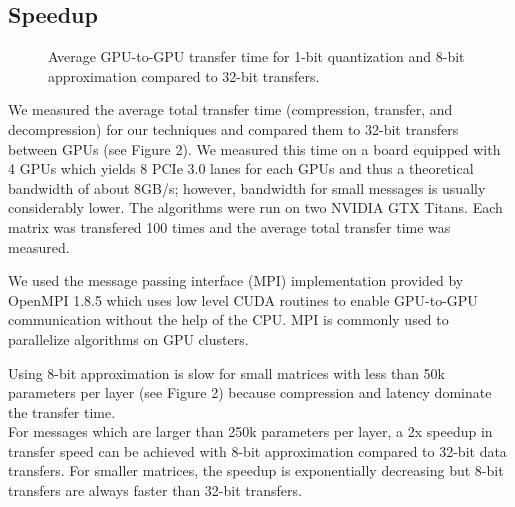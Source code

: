 \documentclass{article} %
\begin{document}
\subsection{Speedup}
\begin{figure}[h]
	\begin{center}
	\end{center}
	\caption{Average GPU-to-GPU transfer time for 1-bit quantization and 8-bit approximation compared to 32-bit transfers.}
\end{figure}
We measured the average total transfer time (compression, transfer, and decompression) for our techniques and compared them to 32-bit transfers between GPUs (see Figure 2). We measured this time on a board equipped with 4 GPUs which yields 8 PCIe 3.0 lanes for each GPUs and thus a theoretical bandwidth of about 8GB/s; however, bandwidth for small messages is usually considerably lower. The algorithms were run on two NVIDIA GTX Titans. Each matrix was transfered 100 times and the average total transfer time was measured.

We used the message passing interface (MPI) implementation provided by OpenMPI 1.8.5 which uses low level CUDA routines to enable GPU-to-GPU communication without the help of the CPU. MPI is commonly used to parallelize algorithms on GPU clusters.

Using 8-bit approximation is slow for small matrices with less than 50k parameters per layer (see Figure 2) because compression and latency dominate the transfer time.\\
For messages which are larger than 250k parameters per layer, a 2x speedup in transfer speed can be achieved with 8-bit approximation compared to 32-bit data transfers. For smaller matrices, the speedup is exponentially decreasing but 8-bit transfers are always faster than 32-bit transfers.
\end{document}
